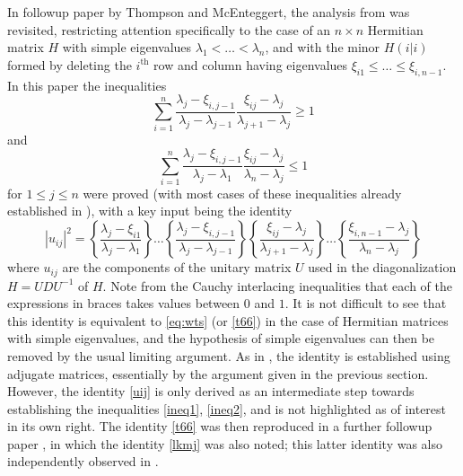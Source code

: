 \documentclass{amsart}
\begin{document}
In followup paper \cite{Thompson:1968} by Thompson and McEnteggert, the analysis from \cite{Thompson:1966} was revisited, restricting attention specifically to the case of an $n \times n$ Hermitian matrix $H$ with simple eigenvalues $\lambda_1 < \dots < \lambda_n$, and with the minor $H(i|i)$ formed by deleting the $i^{\mathrm{th}}$ row and column having eigenvalues $\xi_{i1} \leq \dots \leq \xi_{i,n-1}$.  In this paper the inequalities
\begin{equation}\label{ineq1}
 \sum_{i=1}^n \frac{\lambda_j - \xi_{i,j-1}}{\lambda_j - \lambda_{j-1}} \frac{\xi_{ij} - \lambda_j}{\lambda_{j+1}-\lambda_j} \geq 1
\end{equation}
and
\begin{equation}\label{ineq2}
 \sum_{i=1}^n \frac{\lambda_j - \xi_{i,j-1}}{\lambda_j - \lambda_1} \frac{\xi_{ij}-\lambda_j}{\lambda_n-\lambda_j} \leq 1
\end{equation}
for $1 \leq j \leq n$ were proved (with most cases of these inequalities already established in \cite{Thompson:1966}), with a key input being the identity
\begin{equation}\label{uij}
|u_{ij}|^2 = \left\{ \frac{\lambda_j - \xi_{i1}}{\lambda_j - \lambda_1} \right\} \dots \left\{ \frac{\lambda_j - \xi_{i,j-1}}{\lambda_j - \lambda_{j-1}} \right\} \left\{ \frac{\xi_{ij}-\lambda_j}{\lambda_{j+1} - \lambda_j} \right\} \dots \left\{ \frac{\xi_{i,n-1}-\lambda_j}{\lambda_{n} - \lambda_j} \right\}
\end{equation}
where $u_{ij}$ are the components of the unitary matrix $U$ used in the diagonalization $H = UDU^{-1}$ of $H$.  Note from the Cauchy interlacing inequalities that each of the expressions in braces takes values between $0$ and $1$. It is not difficult to see that this identity is equivalent to \eqref{eq:wts} (or \eqref{t66}) in the case of Hermitian matrices with simple eigenvalues, and the hypothesis of simple eigenvalues can then be removed by the usual limiting argument.  As in \cite{Thompson:1966}, the identity is established using adjugate matrices, essentially by the argument given in the previous section. However, the identity \eqref{uij} is only derived as an intermediate step towards establishing the inequalities \eqref{ineq1}, \eqref{ineq2}, and is not highlighted as of interest in its own right.  The identity \eqref{t66} was then reproduced in a further followup paper \cite{thompson-iv}, in which the identity \eqref{lkmj} was also noted; this latter identity was also independently observed in \cite{deutsch}.
\end{document}
